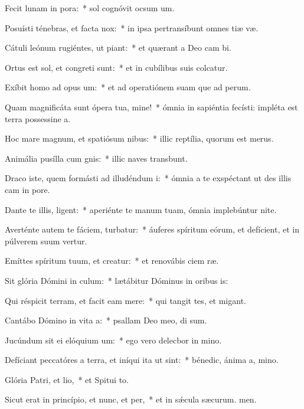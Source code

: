 \item Fecit lunam in pora:~* sol cognóvit ocsum um.
\item Posuísti ténebras, et facta  nox:~* in ipsa pertransíbunt omnes tiæ væ.
\item Cátuli leónum rugiéntes, ut piant:~* et quærant a Deo cam bi.
\item Ortus est sol, et congreti sunt:~* et in cubílibus suis colcatur.
\item Exíbit homo ad opus um:~* et ad operatiónem suam que ad perum.
\item Quam magnificáta sunt ópera tua, mine!~* ómnia in sapiéntia fecísti: impléta est terra possessine a.
\item Hoc mare magnum, et spatiósum nibus:~* illic reptília, quorum  est merus.
\item Animália pusílla cum gnis:~* illic naves transbunt.
\item Draco iste, quem formásti ad illudéndum i:~* ómnia a te exspéctant ut des illis cam in pore.
\item Dante te illis, ligent:~* aperiénte te manum tuam, ómnia implebúntur nite.
\item Averténte autem te fáciem, turbatur:~* áuferes spíritum eórum, et defícient, et in púlverem suum vertur.
\item Emíttes spíritum tuum, et creatur:~* et renovábis ciem ræ.
\item Sit glória Dómini in culum:~* lætábitur Dóminus in oribus is:
\item Qui réspicit terram, et facit eam mere:~* qui tangit tes, et migant.
\item Cantábo Dómino in vita a:~* psallam Deo meo, di sum.
\item Jucúndum sit ei elóquium um:~* ego vero delecbor in mino.
\item Defíciant peccatóres a terra, et iníqui ita ut  sint:~* bénedic, ánima a, mino.
\item Glória Patri, et lio,~* et Spitui to.
\item Sicut erat in princípio, et nunc, et per,~* et in sǽcula sæcurum. men.
